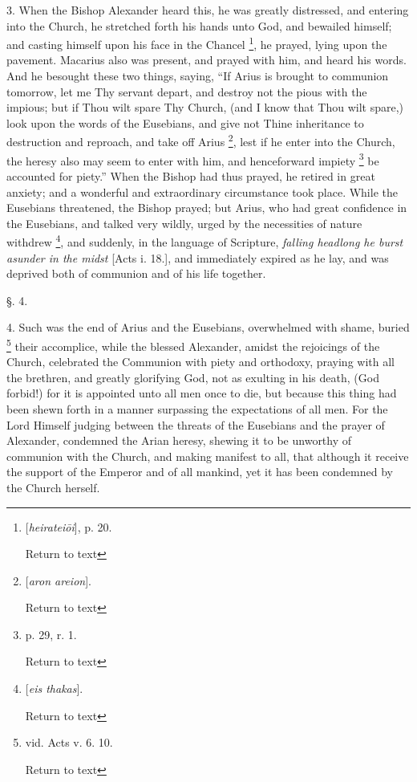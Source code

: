 3. When the Bishop Alexander heard this, he was
greatly distressed, and entering into the Church, he stretched forth
his hands unto God, and bewailed himself; and casting himself upon his
face in the Chancel \footnote{[\emph{heiratei\={o}i}], p. 20.

Return to text}, he
prayed, lying upon the pavement. Macarius also was present, and prayed
with him, and heard his words. And he besought these two things,
saying, “If Arius is brought to communion tomorrow, let me Thy
servant depart, and destroy not the pious with the impious; but if
Thou wilt spare Thy Church, (and I know that Thou wilt spare,) look
upon the words of the Eusebians, and give not Thine inheritance to
destruction and reproach, and take off Arius \footnote{[\emph{aron areion}].

Return to text}, lest if he enter into the Church, the heresy also may seem to
enter with him, and henceforward impiety \footnote{p. 29, r. 1.

Return to text} be accounted for piety.” When the Bishop had thus prayed, he
retired in great anxiety; and a wonderful and extraordinary
circumstance took place. While the Eusebians threatened, the Bishop
prayed; but Arius, who had great confidence in the Eusebians, and
talked very wildly, urged by the necessities of nature withdrew \footnote{[\emph{eis thakas}].

Return to text}, and suddenly, in the language of Scripture, \emph{falling
headlong he burst asunder in the midst} [Acts i. 18.], and
immediately expired as he lay, and was deprived both of communion and
of his life together.

§. 4.

4. Such was the end of Arius and the Eusebians,
overwhelmed with shame, buried \footnote{vid. Acts v. 6. 10.

Return to text} their accomplice, while the blessed Alexander, amidst the
rejoicings of the Church, celebrated the Communion with piety and
orthodoxy, praying with all the brethren, and greatly glorifying God,
not as exulting in his death, (God forbid!) for it is appointed unto
all men once to die, but because this thing had been shewn forth in a
manner surpassing the expectations of all men. For the Lord Himself
judging between the threats of the Eusebians and the prayer of
Alexander, condemned the Arian heresy, shewing it to be unworthy
of communion with the Church, and making manifest to all, that
although it receive the support of the Emperor and of all mankind, yet
it has been condemned by the Church herself.

